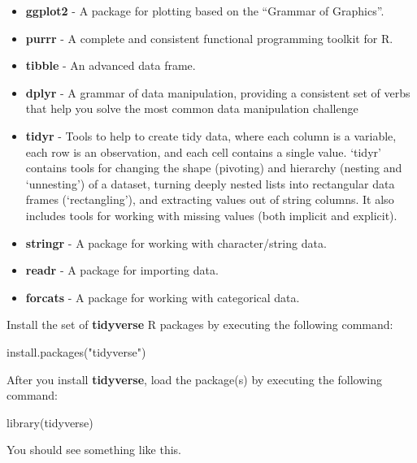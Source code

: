 \documentclass[
]{article}
\newenvironment{Shaded}{\begin{snugshade}}{\end{snugshade}}
\newcommand{\FunctionTok}[1]{\textcolor[rgb]{0.00,0.00,0.00}{#1}}
\newcommand{\NormalTok}[1]{#1}
\newcommand{\StringTok}[1]{\textcolor[rgb]{0.31,0.60,0.02}{#1}}
\providecommand{\tightlist}{%
  \setlength{\itemsep}{0pt}\setlength{\parskip}{0pt}}
\begin{document}
\begin{itemize}
\tightlist
\item
  \textbf{ggplot2} - A package for plotting based on the ``Grammar of
  Graphics''.
\item
  \textbf{purrr} - A complete and consistent functional programming
  toolkit for R.
\item
  \textbf{tibble} - An advanced data frame.
\item
  \textbf{dplyr} - A grammar of data manipulation, providing a
  consistent set of verbs that help you solve the most common data
  manipulation challenge
\item
  \textbf{tidyr} - Tools to help to create tidy data, where each column
  is a variable, each row is an observation, and each cell contains a
  single value. `tidyr' contains tools for changing the shape (pivoting)
  and hierarchy (nesting and `unnesting') of a dataset, turning deeply
  nested lists into rectangular data frames (`rectangling'), and
  extracting values out of string columns. It also includes tools for
  working with missing values (both implicit and explicit).
\item
  \textbf{stringr} - A package for working with character/string data.
\item
  \textbf{readr} - A package for importing data.
\item
  \textbf{forcats} - A package for working with categorical data.
\end{itemize}

Install the set of \textbf{tidyverse} R packages by executing the
following command:

\begin{Shaded}
\begin{Highlighting}[]
\FunctionTok{install.packages}\NormalTok{(}\StringTok{"tidyverse"}\NormalTok{)}
\end{Highlighting}
\end{Shaded}

After you install \textbf{tidyverse}, load the package(s) by executing
the following command:

\begin{Shaded}
\begin{Highlighting}[]
\FunctionTok{library}\NormalTok{(tidyverse)}
\end{Highlighting}
\end{Shaded}

You should see something like this.
\end{document}
